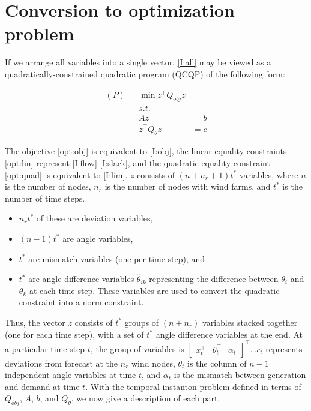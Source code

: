 \documentclass[conference]{IEEEtran}
\begin{document}
\section{Conversion to optimization problem}

If we arrange all variables into a single vector, \eqref{I:all} may be viewed as a quadratically-constrained quadratic program (QCQP) of the following form:

\begin{subequations}\label{opt}
\begin{align}
\label{opt:obj} (P)& & \min z^\top Q_{obj} z &\\
\nonumber && s.t.&\\
\label{opt:lin} && Az &= b \\
\label{opt:quad} && z^\top Q_{\theta}z &= c
\end{align}
\end{subequations}

The objective \eqref{opt:obj} is equivalent to \eqref{I:obj}, the linear equality constraints \eqref{opt:lin} represent \eqref{I:flow}-\eqref{I:slack}, and the quadratic equality constraint \eqref{opt:quad} is equivalent to \eqref{I:lim}. $z$ consists of $(n+n_r+1)t^*$ variables, where $n$ is the number of nodes, $n_r$ is the number of nodes with wind farms, and $t^*$ is the number of time steps.
\begin{itemize}
	\item $n_rt^*$ of these are deviation variables,
    \item $(n-1)t^*$ are angle variables,
    \item $t^*$ are mismatch variables (one per time step), and
    \item $t^*$ are angle difference variables $\hat{\theta}_{ik}$ representing the difference between $\theta_i$ and $\theta_k$ at each time step. These variables are used to convert the quadratic constraint into a norm constraint.
\end{itemize}

Thus, the vector $z$ consists of $t^*$ groups of $(n+n_r)$ variables stacked together (one for each time step), with a set of $t^*$ angle difference variables at the end. At a particular time step $t$, the group of variables is $\begin{bmatrix} x_t^\top & \theta_t^\top & \alpha_t \end{bmatrix}^\top$. $x_t$ represents deviations from forecast at the $n_r$ wind nodes, $\theta_t$ is the column of $n-1$ independent angle variables at time $t$, and $\alpha_t$ is the mismatch between generation and demand at time $t$. With the temporal instanton problem defined in terms of $Q_{obj}$, $A$, $b$, and $Q_{\theta}$, we now give a description of each part.
\end{document}
